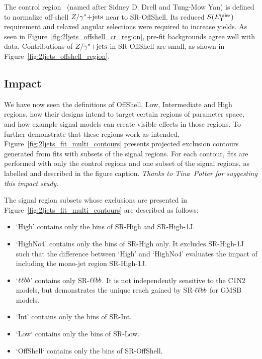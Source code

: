 The control region \crdy\ (named after Sidney D. Drell and Tung-Mow Yan) is
defined to normalize off-shell $Z/\gamma^*\mathrm{+jets}$ near to SR-OffShell.
Its reduced $S(E_\mathrm{T}^\mathrm{miss})$ requirement and relaxed angular selections were required
to increase yields.
As seen in Figure~\ref{fig:2ljets_offshell_cr_region}, pre-fit backgrounds
agree well with data.
Contributions of $Z/\gamma^*\mathrm{+jets}$ in SR-OffShell are small, as shown in
Figure~\ref{fig:2ljets_offshell_region}.


\subsection{Impact}
\label{sec:2ljets_imapct}
We have now seen the definitions of OffShell, Low, Intermediate and High
regions, how their designs intend to target certain regions of parameter space,
and how example signal models can create visible effects in those regions.
To further demonstrate that these regions work as intended,
Figure~\ref{fig:2ljets_fit_multi_contours} presents projected exclusion
contours generated from fits with subsets of the signal regions.
For each contour, fits are performed with only the control regions and one
subset of the signal regions, as labelled and described in the figure caption.
\emph{Thanks to Tina~Potter for suggesting this impact study.}

The signal region subsets whose exclusions are presented in
Figure~\ref{fig:2ljets_fit_multi_contours} are described as follows:
\begin{itemize}
\item `High' contains only the bins of SR-High and SR-High-1J.
\item `HighNo4' contains only the bins of SR-High only.
It excludes SR-High-1J such that the difference between `High' and `HighNo4'
evaluates the impact of including the mono-jet region SR-High-1J.
\item `$\ell\ell bb$' contains only SR-$\ell\ell bb$.
It is not independently sensitive to the C1N2 models, but demonstrates the
unique reach gained by SR-$\ell\ell bb$ for GMSB models.
\item `Int' contains only the bins of SR-Int.
\item `Low` contains only the bins of SR-Low.
\item `OffShell` contains only the bins of SR-OffShell.
\end{itemize}


